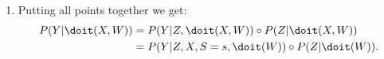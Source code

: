 {\begin{enumerate}
         The 1st rule of do-calculus then shows the equation:
         \begin{align*}
             P(Y|Z,X,\doit(W)) & = P(Y|Z,X,S,\doit(W)).
         \end{align*}
         Since the left hand side is not dependent on $S$ we can evaluate at $S=s$ and get:
         \begin{align*}
             P(Y|Z,X,\doit(W)) & = P(Y|Z,X,S=s,\doit(W)).
         \end{align*}
     \item Putting all points together we get:
        \begin{align*}
            P(Y|\doit(X,W)) &= P(Y|Z,\doit(X,W)) \circ P(Z|\doit(X,W)) \\
                            &= P(Y|Z,X,S=s,\doit(W)) \circ P(Z|\doit(W)).
        \end{align*}
\end{enumerate}
}

